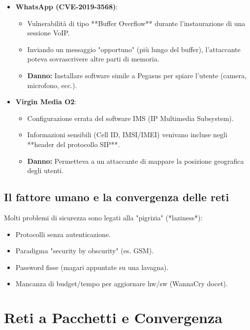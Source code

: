 \documentclass[a4paper,12pt]{article}
\begin{document}
\begin{itemize}
\begin{itemize}
    \item \textbf{WhatsApp (CVE-2019-3568)}:
    \begin{itemize}
        \item Vulnerabilità di tipo **Buffer Overflow** durante l'instaurazione di una sessione VoIP.
        \item Inviando un messaggio "opportuno" (più lungo del buffer), l'attaccante poteva sovrascrivere altre parti di memoria.
        \item \textbf{Danno:} Installare software simile a Pegasus per spiare l'utente (camera, microfono, ecc.).
    \end{itemize}

    \item \textbf{Virgin Media O2}:
    \begin{itemize}
        \item Configurazione errata del software IMS (IP Multimedia Subsystem).
        \item Informazioni sensibili (Cell ID, IMSI/IMEI) venivano incluse negli **header del protocollo SIP**.
        \item \textbf{Danno:} Permetteva a un attaccante di mappare la posizione geografica degli utenti.
    \end{itemize}
\end{itemize}

\subsection{Il fattore umano e la convergenza delle reti}
Molti problemi di sicurezza sono legati alla "pigrizia" (*laziness*):
\begin{itemize}
    \item Protocolli senza autenticazione.
    \item Paradigma "security by obscurity" (es. GSM).
    \item Password fisse (magari appuntate su una lavagna).
    \item Mancanza di budget/tempo per aggiornare hw/sw (WannaCry docet).
\end{itemize}

\section{Reti a Pacchetti e Convergenza}


\end{itemize}
\end{document}
